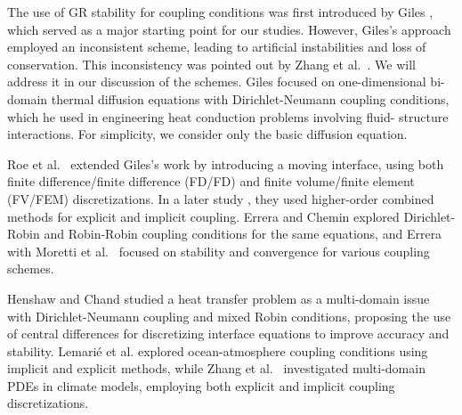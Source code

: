 The use of GR stability for coupling conditions was first introduced by Giles \cite{GIL}, which served as a major starting point for our studies. 
However, Giles's approach employed an inconsistent scheme, leading to artificial instabilities and loss of conservation. This inconsistency was 
pointed out by Zhang et al.\ \cite{zhang}. We will address it in our discussion of the schemes. Giles focused on one-dimensional bi-domain 
thermal diffusion equations with Dirichlet-Neumann coupling conditions, which he used in engineering heat conduction problems involving fluid-
structure interactions. For simplicity, we consider only the basic diffusion equation.

Roe et al.\ \cite{roe2007stability} extended Giles's work by introducing a moving interface, using both finite difference/finite difference (FD/FD) and finite volume/finite element (FV/FEM) discretizations. In a later study \cite{roe2008combined}, they used higher-order combined methods for explicit and implicit coupling. Errera and Chemin \cite{errera2013optimal} explored Dirichlet-Robin and Robin-Robin coupling conditions for the same equations, and Errera with Moretti et al.\ \cite{moretti2018stability} focused on stability and convergence for various coupling schemes.

Henshaw and Chand \cite{chand} studied a heat transfer problem as a multi-domain issue with Dirichlet-Neumann coupling and mixed Robin conditions, proposing the use of central differences for discretizing interface equations to improve accuracy and stability. Lemari\'{e} et al. \cite{lemarie2015analysis} explored ocean-atmosphere coupling conditions using implicit and explicit methods, while Zhang et al.\ \cite{zhang} investigated multi-domain PDEs in climate models, employing both explicit and implicit coupling discretizations.


